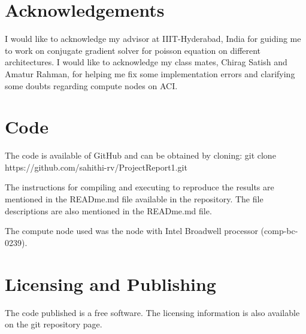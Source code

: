 \documentclass{article}
\begin{document}
\begin{spacing}{1.1}
\newpage
\begin{appendices}

\section{Acknowledgements}

I would like to acknowledge my advisor at IIIT-Hyderabad, India for guiding me to work on conjugate gradient solver for poisson equation on different architectures. I would like to acknowledge my class mates, Chirag Satish and Amatur Rahman, for helping me fix some implementation errors and clarifying some doubts regarding compute nodes on ACI.

\section{Code}

The code is available of GitHub and can be obtained by cloning:
git clone https://github.com/sahithi-rv/ProjectReport1.git

The instructions for compiling and executing to reproduce the results are mentioned in the READme.md file available in the repository. The file descriptions are also mentioned in the READme.md file.

The compute node used was the node with Intel Broadwell processor (comp-bc-0239).

\section{Licensing and Publishing}
	
	The code published is a free software.
	The licensing information is also available on the git repository page.

\end{appendices}




\end{spacing}
\end{document}
